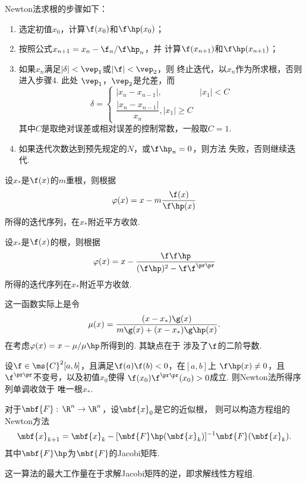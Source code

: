   \begin{alg}[Newton法]
    Newton法求根的步骤如下：
    \begin{enumerate}
      \item 选定初值$x_0$，计算$\f(x_0)$和$\f\hp(x_0)$；
      \item 按照公式$x_{n+1} = x_n - \f_n/\f\hp_n$，并
            计算$\f(x_{n+1})$和$\f\hp(x_{n+1})$；
      \item 如果$x_n$满足$|\delta|<\vep_1$或$|\f|<\vep_2$，则
        终止迭代，以$x_n$作为所求根，否则进入步骤4. 此处
        $\vep_1$，$\vep_2$是允差，而
        \[
          \delta =
          \begin{cases}
            |x_{n}-x_{n-1}|, & |x_1|<C \\
            \dfrac{|x_n-x_{n-1}|}{x_n}, |x_1|\ge C
          \end{cases}
        \]
        其中$C$是取绝对误差或相对误差的控制常数，一般取$C=1$.
      \item 如果迭代次数达到预先规定的$N$，或$\f\hp_n=0$，则方法
        失败，否则继续迭代.
    \end{enumerate}
  \end{alg}

  \begin{thm}[重根情况的Newton法]
    设$x_*$是$\f(x)$的$m$重根，则根据
    \[
      \varphi(x) = x - m \frac{\f(x)}{\f\hp(x)}
    \]
    所得的迭代序列，在$x_*$附近平方收敛.
  \end{thm}

  \begin{thm}[重根情况的Newton法]
    设$x_*$是$\f(x)$的根，则根据
    \[
      \varphi(x) = x - \frac{\f\f\hp}{(\f\hp)^2 - \f\f^{\pr\pr}}
    \]
    所得的迭代序列在$x_*$附近平方收敛.
  \end{thm}
  \remark
    这一函数实际上是令
    \[
      \mu(x) = \frac{(x-x_*)\g(x)}{m\g(x) + (x-x_*)\g\hp(x)}.
    \]
    在考虑$\varphi(x) = x - \mu/\mu\hp$所得到的. 其缺点在于
    涉及了$\f$的二阶导数.

  \begin{thm}[Newton法的收敛区间]
    设$\f\in\ms{C}^2[a, b]$，且满足$\f(a)\f(b)<0$，在$[a, b]$上
    $\f\hp(x)\ne 0$，且$\f^{\pr\pr}$不变号，以及初值$x_0$使得
    $\f(x_0)\f^{\pr\pr}(x_0)>0$成立. 则Newton法所得序列单调收敛于
    唯一根$x_*$.
  \end{thm}

  \begin{pos}[方程组情况的推广]
    对于$\mbf{F}:\,\R^n\to\R^n$，设$\mbf{x}_0$是它的近似根，
    则可以构造方程组的Newton方法
    \[
      \mbf{x}_{k+1} = \mbf{x}_k - [\mbf{F}\hp(\mbf{x}_k)]^{-1}\mbf{F}(\mbf{x}_k).
    \]
    其中$\mbf{F}\hp$为$\mbf{F}$的Jacobi矩阵.
  \end{pos}
  \remark
    这一算法的最大工作量在于求解Jacobi矩阵的逆，即求解线性方程组.
